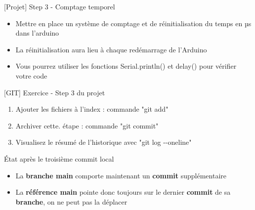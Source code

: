 \documentclass[a4paper,11pt]{beamer}
\newcounter{exampleBlockCounter}
\begin{document}
\begin{frame}
\begin{exampleblock}{[Projet] Step 3 - Comptage temporel}
\begin{itemize}
\item Mettre en place un système de comptage et de réinitialisation du temps en µs dans l'arduino
\item La réinitialisation aura lieu à chaque redémarrage de l'Arduino
\item Vous pourrez utiliser les fonctions Serial.println() et delay() pour vérifier votre code
\end{itemize}
\end{exampleblock}

\begin{exampleblock}{[GIT] Exercice  - Step 3 du projet} 
\begin{enumerate}
    \item Ajouter les fichiers à l'index : commande "git add"
    \item Archiver cette.
     étape : commande "git commit"
     \item Visualisez le résumé de l'historique avec "git log -{}-oneline" 
\end{enumerate}
\end{exampleblock}
\end{frame}

\begin{frame}
\begin{block}{État après le troisième commit local}
\centering
{}
\begin{itemize}
	\item La \textbf{branche main} comporte maintenant un \textbf{commit} supplémentaire
	\item La \textbf{référence main} pointe donc toujours sur le dernier \textbf{commit} de sa \textbf{branche}, on ne peut pas la déplacer
\end{itemize}
\end{block}
\end{frame}
\end{document}
